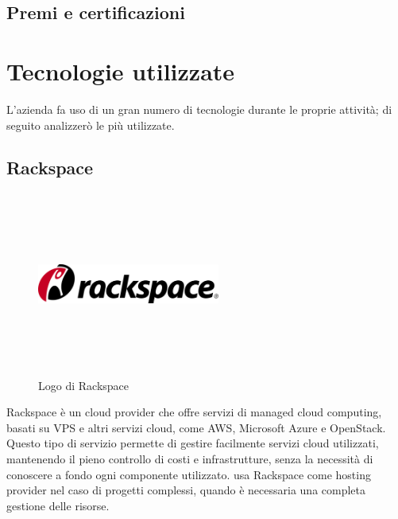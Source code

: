    \subsection{Premi e certificazioni}

\section{Tecnologie utilizzate}
L'azienda fa uso di un gran numero di tecnologie durante le proprie attività; di seguito analizzerò le più utilizzate.

   \subsection{Rackspace}
   \begin{figure}[H]
      \begin{center}
         \includegraphics[width=6cm,height=6cm,keepaspectratio]{immagini/rackspace-logo}
      \end{center}
      \caption{Logo di Rackspace}\label{logorackspace}
   \end{figure}
   Rackspace è un cloud provider che offre servizi di managed cloud computing, basati su \gls{VPS} e altri servizi cloud, come \gls{AWS}, Microsoft Azure e OpenStack. Questo tipo di servizio permette di gestire facilmente servizi cloud utilizzati, mantenendo il pieno controllo di costi e infrastrutture, senza la necessità di conoscere a fondo ogni componente utilizzato. 
   \nomeAzienda{} usa Rackspace come hosting provider nel caso di progetti complessi, quando è necessaria una completa gestione delle risorse.

